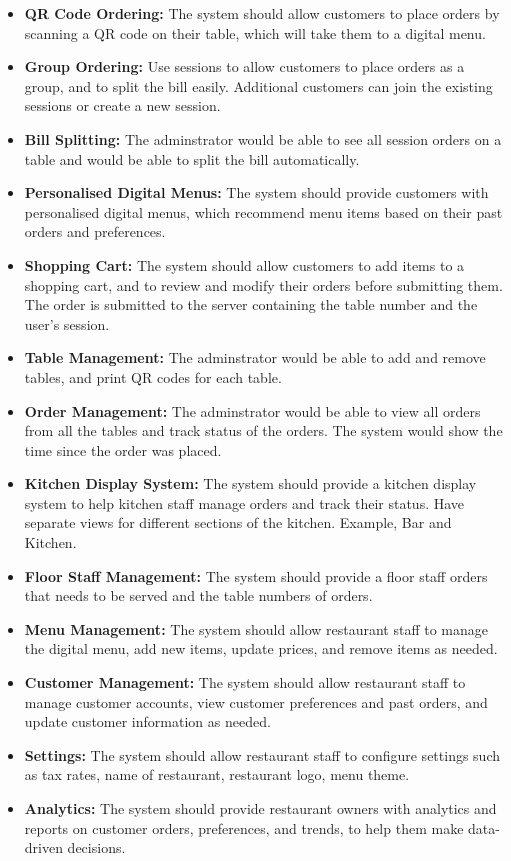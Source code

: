 \begin{itemize}
    \item \textbf{QR Code Ordering:} The system should allow customers to place orders by scanning a QR code on their table, which will take them to a digital menu.
    \item \textbf{Group Ordering:} Use sessions to allow customers to place orders as a group, and to split the bill easily. Additional customers can join the existing sessions or create a new session.
    \item \textbf{Bill Splitting:} The adminstrator would be able to see all session orders on a table and would be able to split the bill automatically.
    \item \textbf{Personalised Digital Menus:} The system should provide customers with personalised digital menus, which recommend menu items based on their past orders and preferences.
    \item \textbf{Shopping Cart:} The system should allow customers to add items to a shopping cart, and to review and modify their orders before submitting them. The order is submitted to the server containing the table number and the user's session.
    \item \textbf{Table Management:} The adminstrator would be able to add and remove tables, and print QR codes for each table.
    \item \textbf{Order Management:} The adminstrator would be able to view all orders from all the tables and track status of the orders. The system would show the time since the order was placed.
    \item \textbf{Kitchen Display System:} The system should provide a kitchen display system to help kitchen staff manage orders and track their status. Have separate views for different sections of the kitchen. Example, Bar and Kitchen.
    \item \textbf{Floor Staff Management:} The system should provide a floor staff orders that needs to be served and the table numbers of orders.
    \item \textbf{Menu Management:} The system should allow restaurant staff to manage the digital menu, add new items, update prices, and remove items as needed.
    \item \textbf{Customer Management:} The system should allow restaurant staff to manage customer accounts, view customer preferences and past orders, and update customer information as needed.
    \item \textbf{Settings:} The system should allow restaurant staff to configure settings such as tax rates, name of restaurant, restaurant logo, menu theme.
    \item \textbf{Analytics:} The system should provide restaurant owners with analytics and reports on customer orders, preferences, and trends, to help them make data-driven decisions.

\end{itemize}

